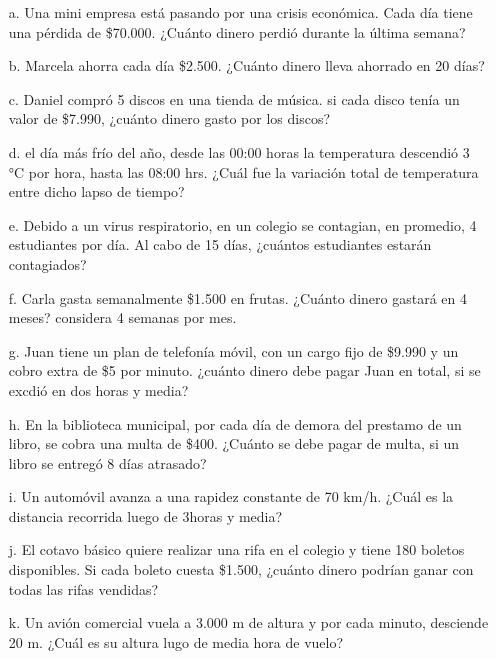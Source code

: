 \documentclass[spanish,letterpaper, 11pt, addpoints, answers]{exam}
\begin{document}
\begin{questions}
\begin{itemize}
  \item[a.] Una mini empresa está pasando por una crisis económica. Cada día tiene una pérdida de \$70.000. ¿Cuánto dinero perdió durante la última semana?
  \vspace{2cm}
  \item[b.]Marcela ahorra cada día \$2.500. ¿Cuánto dinero lleva ahorrado en 20 días?
  \vspace{2cm}
  \item[c.]Daniel compró 5 discos en una tienda de música. si cada disco tenía un valor de \$7.990, ¿cuánto dinero gasto por los discos?
  \vspace{2cm}
  \item[d.]el día más frío del año, desde las 00:00 horas la temperatura descendió 3 °C por hora, hasta las 08:00 hrs. ¿Cuál fue la variación total de temperatura entre dicho lapso de tiempo? 
  \vspace{2cm}
  \item[e.] Debido a un virus respiratorio, en un colegio se contagian, en promedio, 4 estudiantes por día. Al cabo de 15 días, ¿cuántos estudiantes estarán contagiados?
  \vspace{2cm}
  \item[f.]Carla gasta semanalmente \$1.500 en frutas. ¿Cuánto dinero gastará en 4 meses? considera 4 semanas por mes.
  \vspace{2cm}
  \item[g.] Juan tiene un plan de telefonía móvil, con un cargo fijo de \$9.990 y un cobro extra de \$5 por minuto. ¿cuánto dinero debe pagar Juan en total, si se excdió en dos horas y media?
  \vspace{2cm}
  \item[h.] En la biblioteca municipal, por cada día de demora del prestamo de un libro, se cobra una multa de \$400. ¿Cuánto se debe pagar de multa, si un libro se entregó 8 días atrasado?
  \vspace{2cm}
  \item[i.] Un automóvil avanza a una rapidez constante de 70 km/h. ¿Cuál es la distancia recorrida luego de 3horas y media?
  \vspace{2cm}
  \item[j.]El cotavo básico quiere realizar una rifa en el colegio y tiene 180 boletos disponibles. Si cada boleto cuesta \$1.500, ¿cuánto dinero podrían ganar con todas las rifas vendidas? 
  \vspace{2cm}
  \item[k.] Un avión comercial vuela a 3.000 m de altura y por cada minuto, desciende 20 m. ¿Cuál es su altura lugo de media hora de vuelo?
\end{itemize}


\end{questions}
\end{document}
